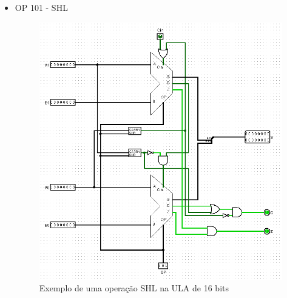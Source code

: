 \documentclass[
	12pt,				%
	openright,			%
	twoside,			%
	a4paper,			%
	english,			%
	french,				%
	spanish,			%
	brazil,				%
	]{abntex2}
\begin{document}
\begin{apendicesenv}
\begin{itemize}
\newpage
\item{OP 101 - SHL}
\begin{figure}[h]
	\begin{center}
	    \includegraphics[scale=0.6]{ULA16SHL.png}
	\end{center}
\caption{\label{ula16shl}Exemplo de uma operação SHL na ULA de 16 bits}
\end{figure}


\end{itemize}
\end{apendicesenv}
\end{document}

